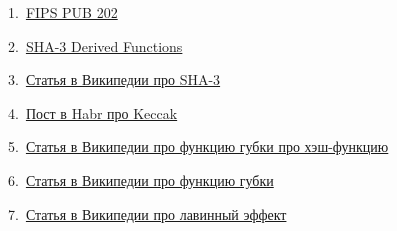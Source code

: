 \documentclass[a4paper,12pt]{article}
\theoremstyle{plain} %
\theoremstyle{definition} %
\theoremstyle{remark} %
\begin{document}
	1.\ \href{https://dx.doi.org/10.6028%2Fnist.fips.202}{FIPS PUB 202}

	
	2.\ \href{https://doi.org/10.6028/NIST.SP.800-185}{SHA-3 Derived Functions}
	
	3.\ \href{https://ru.wikipedia.org/wiki/SHA-3}{Статья в Википедии про SHA-3}
	
	4.\ \href{https://habr.com/ru/post/534082/}{Пост в Habr про Keccak}
	
	5.\ \href{https://ru.wikipedia.org/wiki/Хеш-функция}{Статья в Википедии про функцию губки про хэш-функцию}
	
	6.\ \href{https://ru.wikipedia.org/wiki/Функция_губки}{Статья в Википедии про функцию губки}
	
	7.\ \href{https://ru.wikipedia.org/wiki/Лавинный_эффект}{Статья в Википедии про лавинный эффект}
	
	
	
	

	

	

	
	
	
	
	
\end{document}
